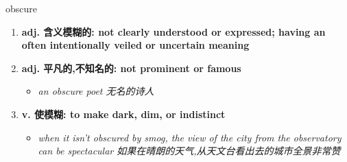 
\begin{frame}
{\huge obscure}
\begin{center}
\begin{enumerate}\Large
  \item \textbf{adj. 含义模糊的: not clearly understood or expressed; having an often intentionally veiled or uncertain meaning}
  \item \textbf{adj. 平凡的,不知名的: not prominent or famous}
  \begin{itemize}
    \item \em{\Large{an obscure poet 无名的诗人}}
  \end{itemize}
  \item \textbf{v. 使模糊: to make dark, dim, or indistinct}
  \begin{itemize}
    \item \em{\Large{when it isn't obscured by smog, the view of the city from the observatory can be spectacular 如果在晴朗的天气,从天文台看出去的城市全景非常赞}}
  \end{itemize}
\end{enumerate}
\end{center}
\end{frame}
